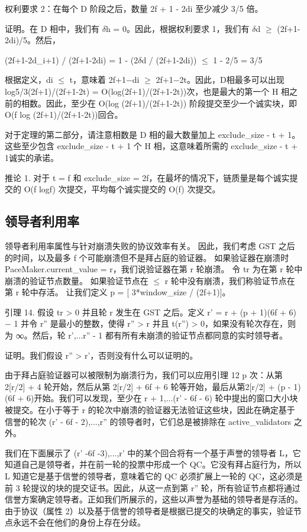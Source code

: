 权利要求 2：在每个 D 阶段之后，数量 2f + 1 - 2di 至少减少 3/5 倍。

证明。在 D 相中，我们有 $\delta$h = 0。因此，根据权利要求 1，我们有 $\delta$d $\geq$ (2f+1-2di)/5。然后，

(2f+1-2d\_i+1) / (2f+1-2di) = 1 - (2$\delta$d / (2f+1-2di)) $\leq$ 1 - 2/5 = 3/5

根据定义，di $\leq$ t，意味着 2f+1−di $\geq$ 2f+1−2t。因此，D相最多可以出现log5/3(2f+1)/(2f+1-2t) = O(log(2f+1)/(2f+1-2t))次，也是最大的第一个 H 相之前的相数。因此，至少在 O(log (2f+1)/(2f+1-2t)) 阶段提交至少一个诚实块，即 O(f log (2f+1)/(2f+1-2t))回合。

对于定理的第二部分，请注意相数是 D 相的最大数量加上 exclude\_size - t + 1。这些至少包含 exclude\_size - t + 1 个 H 相，这意味着所需的 exclude\_size - t + 1诚实的承诺。

推论 1. 对于 t = f 和 exclude\_size = 2f，在最坏的情况下，链质量是每个诚实提交的 O(f logf) 次提交，平均每个诚实提交的 O(f) 次提交。

\subsection{领导者利用率}

领导者利用率属性与针对崩溃失败的协议效率有关。 因此，我们考虑 GST 之后的时间，以及最多 f 个可能崩溃但不是拜占庭的验证器。 如果验证器在崩溃时 PaceMaker.current\_value = r，我们说验证器在第 r 轮崩溃。 令 tr 为在第 r 轮中崩溃的验证节点数量。
如果验证节点在 $\leq$ r 轮中没有崩溃，我们称验证节点在第 r 轮中存活。 让我们定义 p = [ 3*window\_size / (2f+1)]。

引理 14. 假设 tr > 0 并且轮 r 发生在 GST 之后。定义 r' = r + (p + 1)(6f + 6) − 1 并令 r'' 是最小的整数，使得 r'' > r 并且 t(r'') > 0，如果没有轮次存在，则为 ∞。然后，轮 r',...r'' - 1 都有所有未崩溃的验证节点都同意的实时领导者。

证明。我们假设 r'' > r'，否则没有什么可以证明的。

由于拜占庭验证器可以被限制为崩溃行为，我们可以应用引理 12 p 次：从第 2[r/2] + 4 轮开始，然后从第 2[r/2] + 6f + 6 轮等开始，最后从第2[r/2] + (p - 1)(6f + 6)开始。我们可以发现，至少在 r + 1,...(r' - 6f - 6) 轮中提出的窗口大小块被提交。在小于等于 r 的轮次中崩溃的验证器无法验证这些块，因此在确定基于信誉的轮次 (r' - 6f - 2),...,r'' 的领导者时，它们总是被排除在 active\_validators 之外。

我们在下面展示了 (r' -6f -3),...,r' 中的某个回合将有一个基于声誉的领导者 L，它知道自己是领导者，并在前一轮的投票中形成一个 QC。它没有拜占庭行为，所以 L 知道它是基于信誉的领导者，意味着它的 QC 必须扩展上一轮的 QC，这必须是前 3 轮提议的块的提交证书。因此，从这一点到第 r'' 轮，所有验证节点都将通过信誉方案确定领导者。正如我们所展示的，这些以声誉为基础的领导者是存活的。由于协议（属性 2）以及基于信誉的领导者是根据已提交的块确定的事实，验证节点永远不会在他们的身份上存在分歧。

